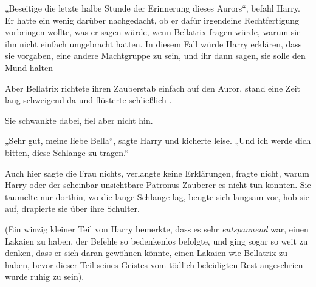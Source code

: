 „Beseitige die letzte halbe Stunde der Erinnerung dieses Aurors“, befahl Harry. Er hatte ein wenig darüber nachgedacht, ob er dafür irgendeine Rechtfertigung vorbringen wollte, was er sagen würde, wenn Bellatrix fragen würde, warum sie ihn nicht einfach umgebracht hatten. In diesem Fall würde Harry erklären, dass sie vorgaben, eine andere Machtgruppe zu sein, und ihr dann sagen, sie solle den Mund halten—

Aber Bellatrix richtete ihren Zauberstab einfach auf den Auror, stand eine Zeit lang schweigend da und flüsterte schließlich .

Sie schwankte dabei, fiel aber nicht hin.

„Sehr gut, meine liebe Bella“, sagte Harry und kicherte leise.
„Und ich werde dich bitten, diese Schlange zu tragen.“

Auch hier sagte die Frau nichts, verlangte keine Erklärungen, fragte nicht, warum Harry oder der scheinbar unsichtbare Patronus-Zauberer es nicht tun konnten. Sie taumelte nur dorthin, wo die lange Schlange lag, beugte sich langsam vor, hob sie auf, drapierte sie über ihre Schulter.

(Ein winzig kleiner Teil von Harry bemerkte, dass es sehr \emph{entspannend} war, einen Lakaien zu haben, der Befehle so bedenkenlos befolgte, und ging sogar so weit zu denken, dass er sich daran gewöhnen könnte, einen Lakaien wie Bellatrix zu haben, bevor dieser Teil seines Geistes vom tödlich beleidigten Rest angeschrien wurde ruhig zu sein).

